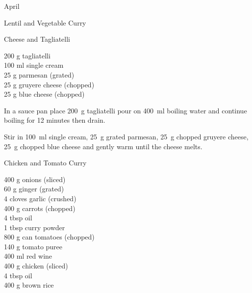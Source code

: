 \begin{menu}{April}
\begin{recipe}{2}{Lentil and Vegetable Curry}
\begin{instructions}
    \end{instructions}
    \end{recipe}%
  
    \begin{recipe}{1}{Cheese and Tagliatelli}%
		\begin{ingredients}
		200 g tagliatelli  \\
	100 ml single cream  \\
	25 g parmesan (grated) \\
	25 g gruyere cheese (chopped) \\
	25 g blue cheese (chopped) \\
	
		\end{ingredients}
	
	
	
    \begin{instructions}
    \item 
    In a
    sauce pan
    place
    200~g  tagliatelli
    pour on
    400~ml  boiling water and continue boiling for 12 minutes then drain.
  \item 
        Stir in
        100~ml  single cream,
        25~g grated parmesan,
        25~g chopped gruyere cheese,
        25~g chopped blue cheese
        and gently warm until the cheese melts.
      
    \end{instructions}
    \end{recipe}%
  
    \begin{recipe}{2}{Chicken and Tomato Curry}%
		\begin{ingredients}
		400 g onions (sliced) \\
	60 g ginger (grated) \\
	4 cloves garlic (crushed) \\
	400 g carrots (chopped) \\
	4 tbsp oil  \\
	1 tbsp curry powder  \\
	800 g can tomatoes (chopped) \\
	140 g tomato puree  \\
	400 ml red wine  \\
	400 g chicken (sliced) \\
	4 tbsp oil  \\
	400 g brown rice  \\
	

\end{ingredients}
\end{recipe}
\end{menu}
